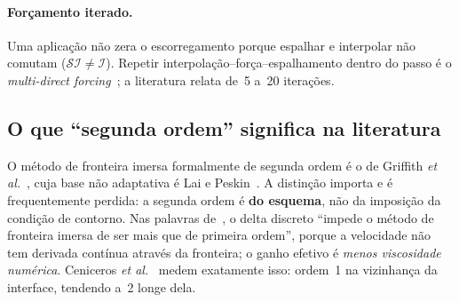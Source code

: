 \paragraph{Forçamento iterado.} Uma aplicação não zera o escorregamento porque
espalhar e interpolar não comutam ($\mathcal{S}\mathcal{I} \neq \mathcal{I}$).
Repetir interpolação--força--espalhamento dentro do passo é o
\emph{multi-direct forcing}~\cite{wang2008}; a literatura relata de~5 a~20
iterações.

\subsection{O que ``segunda ordem'' significa na literatura}

O método de fronteira imersa formalmente de segunda ordem é o de Griffith
\emph{et al.}~\cite{griffith2007}, cuja base não adaptativa é Lai e
Peskin~\cite{lai2000}. A distinção importa e é frequentemente perdida: a segunda
ordem é \textbf{do esquema}, não da imposição da condição de contorno. Nas
palavras de~\cite{lai2000}, o delta discreto ``impede o método de fronteira
imersa de ser mais que de primeira ordem'', porque a velocidade não tem derivada
contínua através da fronteira; o ganho efetivo é \emph{menos viscosidade
numérica}. Ceniceros \emph{et al.}~\cite{ceniceros2010} medem exatamente isso:
ordem~1 na vizinhança da interface, tendendo a~2 longe dela.
